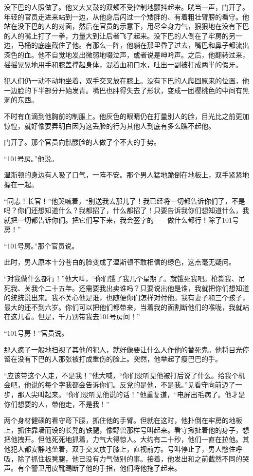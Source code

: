 没下巴的人照做了。他又大又鼓的双颊不受控制地颤抖起来。咣当一声，门开了。年轻的官员走进来站到一边，从他身后闪过一个矮胖的、有着粗壮臂膀的看守。他站在没下巴的人的对面，然后在官员的示意下，用尽全身力气，狠狠地在没有下巴的人的嘴上打了一拳，力量大到让后者飞了起来。没下巴的人倒在了牢房的另一边，马桶的底座截住了他。有那么一阵，他躺在那里昏了过去，嘴巴和鼻子都流出深色的血。他不自觉地发出微弱地啜泣声，或者说是呻吟声。之后，他翻转过来，摇摇晃晃地用手和膝盖撑起身体，混着血和口水，吐出一副被打成两半的假牙。

犯人们仍一动不动地坐着，双手交叉放在膝上。没有下巴的人爬回原来的位置，他一边脸的下半部分开始发青。嘴巴也肿得失去了形状，变成一团樱桃色的中间有黑洞的东西。

不时有血滴到他胸前的制服上。他灰色的眼睛仍在打量别人的脸，目光比之前更加惊惶，就好像要弄明白因为这丢脸的行为其他人到底有多么瞧不起他。

门开了。那个官员向骷髅脸的人做了个不大的手势。

``101号房。''他说。

温斯顿的身边有人吸了口气，一阵不安。那个男人猛地跪倒在地板上，双手紧紧地握在一起。

``同志！长官！''他哭喊着，``别送我去那儿了！我已经将一切都告诉你们了，不是吗？你们还想知道什么？我都招了，什么都招了！只要告诉我你们想知道什么，我就把一切都告诉你们。把它们写下来，我会签字的——做什么都行！除了101号房！''

``101号房。''那个官员说。

此时，男人原本十分苍白的脸变成了温斯顿不敢相信的绿色，这点毫无疑问。

``对我做什么都行！''他大叫，``你们饿了我几个星期了。就饿死我吧。枪毙我、吊死我、关我个二十五年。还需要我出卖谁吗？只要说出他是谁，我就把你们想知道的统统说出来。我不关心他是谁，也随便你们怎样对付他。我有妻子和三个孩子，最大的还不到六岁。你们可以把他们都带来，当着我的面割断他们的喉咙，我就站在这儿看。但是，千万别带我去101号房间！''

``101号房！''官员说。

那人疯子一般地扫视了其他的犯人，就好像要让什么人作他的替死鬼。他将目光停留在没有下巴的人那张被打成重伤的脸上。突然，他举起了瘦巴巴的手。

``应该带这个人走，不是我！''他大喊，``你们没听见他被打后说了什么。给我个机会吧，他说的每个字我都会告诉你们。反党的是他，不是我。''见看守向前迈了一步，那人尖叫起来。``你们没听见他说的话！''他重复道，``电屏出毛病了。他才是你们想要的人，带他走，不是我！''

两个身材健硕的看守弯下腰，抓住他的手臂。但就在这时，他扑倒在牢房的地板上，抓住靠墙而设的长凳的铁腿，像野兽那样号叫起来。看守揪扯着他的身子，想把他拽开。但他死死地抓着，力气大得惊人。大约有二十秒，他们一直在拉他。其他犯人都安静地坐着，双手交叉放于膝上，直视前方。号叫停止了，男人憋住呼吸，除了抓住板凳腿，他已没有力气做别的事。接着，他发出和之前截然不同的哭声。有个警卫用皮靴踢断了他的手指，他们将他拖了起来。

